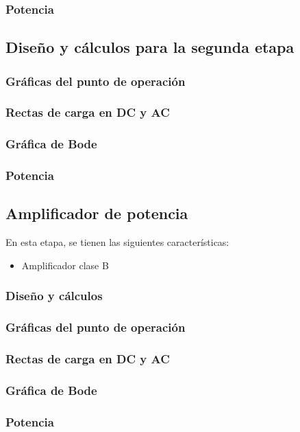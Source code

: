 \documentclass[a4paper, 12pt]{article}
\begin{document}
\subsubsection{Potencia}

\subsection{Diseño y cálculos para la segunda etapa}
\subsubsection{Gráficas del punto de operación}
\subsubsection{Rectas de carga en DC y AC}
\subsubsection{Gráfica de Bode}
\subsubsection{Potencia}

\newpage
\subsection{Amplificador de potencia}
En esta etapa, se tienen las siguientes características: 
\begin{itemize}
    \item Amplificador clase B
\end{itemize}

\subsubsection{Diseño y cálculos}
\subsubsection{Gráficas del punto de operación}
\subsubsection{Rectas de carga en DC y AC}
\subsubsection{Gráfica de Bode}
\subsubsection{Potencia}
\end{document}
